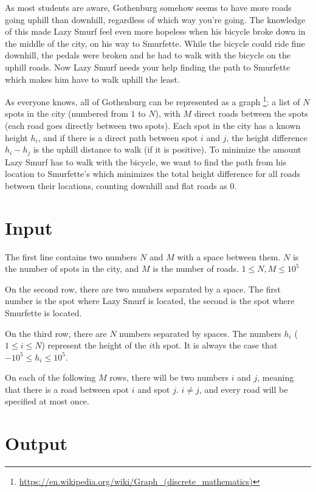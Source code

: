 
As most students are aware, Gothenburg somehow seems to have more roads going uphill than downhill,
regardless of which way you're going. The knowledge of this made Lazy Smurf feel even more hopeless
when his bicycle broke down in the middle of the city, on his way to Smurfette. While the bicycle could ride
fine downhill, the pedals were broken and he had to walk with the bicycle on the uphill roads. Now Lazy Smurf needs
your help finding the path to Smurfette which makes him have to walk
uphill the least.

As everyone knows, all of Gothenburg can be represented as a graph
\footnote{\url{https://en.wikipedia.org/wiki/Graph_(discrete_mathematics)}}:
a list of $N$ spots in the city (numbered from $1$ to $N$), with $M$ direct roads
between the spots (each road goes directly between two spots). Each spot in the city has a known
height $h_i$, and if there is a direct path between spot $i$ and $j$, the height difference $h_i-h_j$
is the uphill distance to walk (if it is positive). To minimize the amount Lazy Smurf has to walk
with the bicycle, we want to find the path from his location to Smurfette's which minimizes the total
height difference for all roads between their locations, counting downhill and flat roads as 0.

\section*{Input}
The first line contains two numbers $N$ and $M$ with a space between them. $N$
is the number of spots in the city, and $M$ is the number of roads. $1 \le N, M \le 10^5$

On the second row, there are two numbers separated by a space. The first number is the spot where
Lazy Smurf is located, the second is the spot where Smurfette is located.

On the third row, there are $N$ numbers separated by spaces. The numbers $h_i$ ($1 \le i \le N$)
represent the height of the $i$th spot. It is always the case that $ -10^5 \le h_i \le 10^5 $.

On each of the following $M$ rows, there will be two numbers $i$ and $j$, meaning that there is a
road between spot $i$ and spot $j$. $i \ne j $, and every road will be specified at most once.

\section*{Output}

